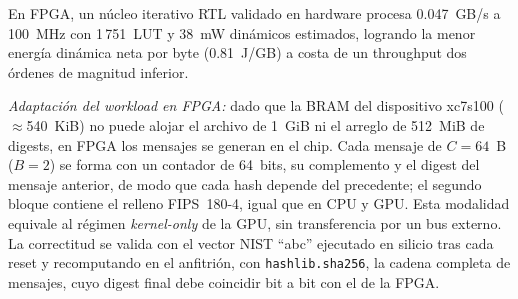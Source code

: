 

En FPGA, un núcleo iterativo RTL validado en hardware procesa 0.047~GB/s a
100~MHz con 1\,751~LUT y 38~mW dinámicos estimados, logrando la menor
energía dinámica neta por byte (0.81~J/GB) a costa de un throughput dos
órdenes de magnitud inferior.



\textit{Adaptación del workload en FPGA:} dado que la BRAM del dispositivo
xc7s100 ($\approx$540~KiB) no puede alojar el archivo de 1~GiB ni el arreglo
de 512~MiB de digests, en FPGA los mensajes se generan en el chip. Cada
mensaje de $C = 64$~B ($B = 2$) se forma con un contador de 64~bits, su
complemento y el digest del mensaje anterior, de modo que cada hash depende
del precedente; el segundo bloque contiene el relleno FIPS~180-4, igual que
en CPU y GPU. Esta modalidad equivale al régimen \textit{kernel-only} de la
GPU, sin transferencia por un bus externo. La correctitud se valida con el
vector NIST ``abc'' ejecutado en silicio tras cada reset y recomputando en el
anfitrión, con \texttt{hashlib.sha256}, la cadena completa de mensajes, cuyo
digest final debe coincidir bit a bit con el de la FPGA.


